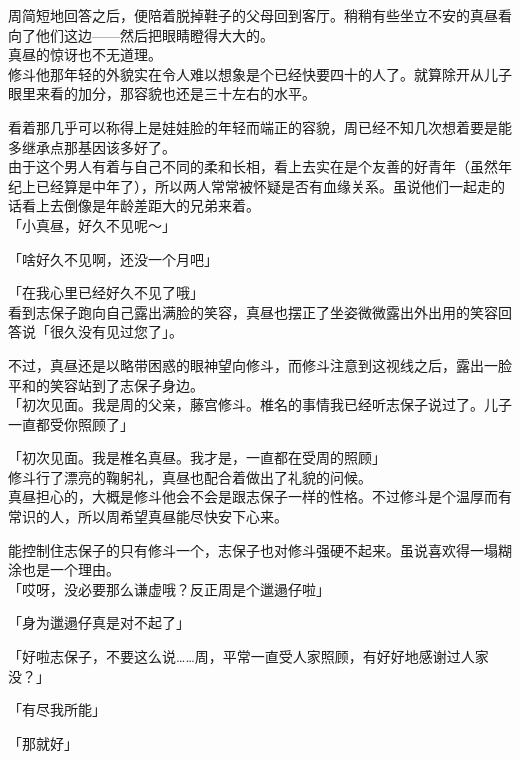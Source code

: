 周简短地回答之后，便陪着脱掉鞋子的父母回到客厅。稍稍有些坐立不安的真昼看向了他们这边——然后把眼睛瞪得大大的。\\

真昼的惊讶也不无道理。\\

修斗他那年轻的外貌实在令人难以想象是个已经快要四十的人了。就算除开从儿子眼里来看的加分，那容貌也还是三十左右的水平。

看着那几乎可以称得上是娃娃脸的年轻而端正的容貌，周已经不知几次想着要是能多继承点那基因该多好了。\\

由于这个男人有着与自己不同的柔和长相，看上去实在是个友善的好青年（虽然年纪上已经算是中年了），所以两人常常被怀疑是否有血缘关系。虽说他们一起走的话看上去倒像是年龄差距大的兄弟来着。\\

「小真昼，好久不见呢～」

「啥好久不见啊，还没一个月吧」

「在我心里已经好久不见了哦」\\

看到志保子跑向自己露出满脸的笑容，真昼也摆正了坐姿微微露出外出用的笑容回答说「很久没有见过您了」。

不过，真昼还是以略带困惑的眼神望向修斗，而修斗注意到这视线之后，露出一脸平和的笑容站到了志保子身边。\\

「初次见面。我是周的父亲，藤宫修斗。椎名的事情我已经听志保子说过了。儿子一直都受你照顾了」

「初次见面。我是椎名真昼。我才是，一直都在受周的照顾」\\

修斗行了漂亮的鞠躬礼，真昼也配合着做出了礼貌的问候。\\

真昼担心的，大概是修斗他会不会是跟志保子一样的性格。不过修斗是个温厚而有常识的人，所以周希望真昼能尽快安下心来。

能控制住志保子的只有修斗一个，志保子也对修斗强硬不起来。虽说喜欢得一塌糊涂也是一个理由。\\

「哎呀，没必要那么谦虚哦？反正周是个邋遢仔啦」

「身为邋遢仔真是对不起了」

「好啦志保子，不要这么说……周，平常一直受人家照顾，有好好地感谢过人家没？」

「有尽我所能」

「那就好」\\

